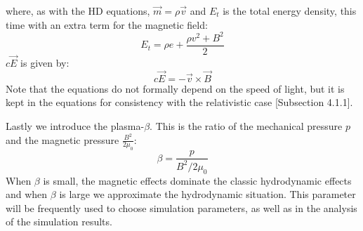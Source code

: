 where, as with the HD equations, $\vec{m}=\rho\vec{v}$ and $E_t$ is the total energy density, this time with an extra term for the magnetic field:
\begin{equation*}
	E_t = \rho e + \frac{\rho v^2 + B^2}{2}
\end{equation*}
$c\vec{E}$ is given by:
\begin{equation*}
	c\vec{E} = -\vec{v}\times \vec{B}
\end{equation*}
Note that the equations do not formally depend on the speed of light, but it is kept in the equations for consistency with the relativistic case \cite{notes-principles-MHD} [Subsection 4.1.1].

Lastly we introduce the plasma-$\beta$. 
This is the ratio of the mechanical pressure $p$ and the magnetic pressure $ \frac{B^2}{2\mu_0} $:
\begin{equation*}
	\beta = \frac{p}{B^2/2\mu_0}
\end{equation*}
When $\beta$ is small, the magnetic effects dominate the classic hydrodynamic effects and when $\beta$ is large we approximate the hydrodynamic situation.
This parameter will be frequently used to choose simulation parameters, as well as in the analysis of the simulation results.
